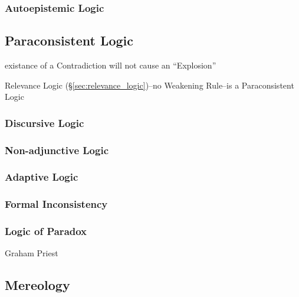 \subsubsection{Autoepistemic Logic}\label{sec:autoepistemic_logic}



\subsection{Paraconsistent Logic}\label{sec:paraconsistent_logic}

existance of a Contradiction will not cause an ``Explosion''

Relevance Logic (\S\ref{sec:relevance_logic})--no Weakening Rule--is a
Paraconsistent Logic



\subsubsection{Discursive Logic}\label{sec:discursive_logic}

\subsubsection{Non-adjunctive Logic}\label{sec:nonadjunctive_logic}

\subsubsection{Adaptive Logic}\label{sec:adaptive_logic}

\subsubsection{Formal Inconsistency}\label{sec:formal_inconsistency}

\subsubsection{Logic of Paradox}\label{sec:logic_of_paradox}

Graham Priest



\subsection{Mereology}\label{sec:mereology}

